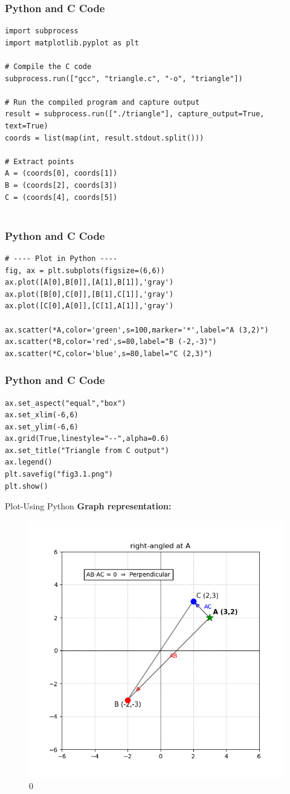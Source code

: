 \documentclass{beamer}
\begin{document}
    \begin{frame}[fragile]
\frametitle{Python and C Code}

\begin{lstlisting}
import subprocess
import matplotlib.pyplot as plt

# Compile the C code
subprocess.run(["gcc", "triangle.c", "-o", "triangle"])

# Run the compiled program and capture output
result = subprocess.run(["./triangle"], capture_output=True, text=True)
coords = list(map(int, result.stdout.split()))

# Extract points
A = (coords[0], coords[1])
B = (coords[2], coords[3])
C = (coords[4], coords[5])


\end{lstlisting}

\end{frame}


  \begin{frame}[fragile]
\frametitle{Python and C Code}

\begin{lstlisting}
# ---- Plot in Python ----
fig, ax = plt.subplots(figsize=(6,6))
ax.plot([A[0],B[0]],[A[1],B[1]],'gray')
ax.plot([B[0],C[0]],[B[1],C[1]],'gray')
ax.plot([C[0],A[0]],[C[1],A[1]],'gray')

ax.scatter(*A,color='green',s=100,marker='*',label="A (3,2)")
ax.scatter(*B,color='red',s=80,label="B (-2,-3)")
ax.scatter(*C,color='blue',s=80,label="C (2,3)")
\end{lstlisting}

\end{frame}

    \begin{frame}[fragile]
\frametitle{Python and C Code}

\begin{lstlisting}
ax.set_aspect("equal","box")
ax.set_xlim(-6,6)
ax.set_ylim(-6,6)
ax.grid(True,linestyle="--",alpha=0.6)
ax.set_title("Triangle from C output")
ax.legend()
plt.savefig("fig3.1.png")
plt.show()
\end{lstlisting}

\end{frame}


\begin{frame}{Plot-Using  Python}
\textbf{Graph representation:}
\begin{figure}[H]
    \centering
 \includegraphics[width=0.5\linewidth]{fig3.png}
    \caption{0}
    \label{fig:placeholder}
\end{figure}
\end{frame}
\end{document}

